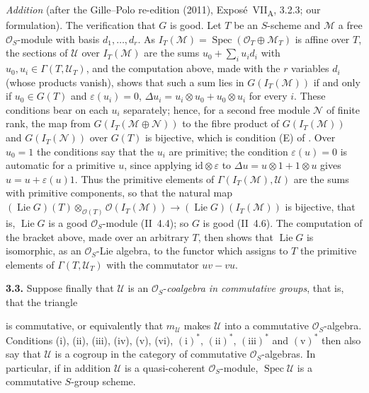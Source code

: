 \par\medskip\noindent
\emph{Addition} (after the Gille--Polo re-edition (2011),
Expos\'e~VII\textsubscript{A}, 3.2.3; our formulation). The verification
that \(G\) is good. Let \(T\) be an \(S\)-scheme and \(\mathcal M\) a free
\(\mathcal O_S\)-module with basis \(d_1,\ldots,d_r\). As
\(I_T(\mathcal M)=\operatorname{Spec}(\mathcal O_T\oplus\mathcal M_T)\) is
affine over \(T\), the sections of \(\mathcal U\) over
\(I_T(\mathcal M)\) are the sums \(u_0+\sum_iu_id_i\) with
\(u_0,u_i\in\Gamma(T,\mathcal U_T)\), and the computation above, made
with the \(r\) variables \(d_i\) (whose products vanish), shows that such
a sum lies in \(G(I_T(\mathcal M))\) if and only if \(u_0\in G(T)\) and
\(\varepsilon(u_i)=0\), \(\Delta u_i=u_i\otimes u_0+u_0\otimes u_i\) for
every \(i\). These conditions bear on each \(u_i\) separately; hence, for
a second free module \(\mathcal N\) of finite rank, the map from
\(G(I_T(\mathcal M\oplus\mathcal N))\) to the fibre product of
\(G(I_T(\mathcal M))\) and \(G(I_T(\mathcal N))\) over \(G(T)\) is
bijective, which is condition (E) of . Over \(u_0=1\) the
conditions say that the \(u_i\) are primitive; the condition
\(\varepsilon(u)=0\) is automatic for a primitive \(u\), since applying
\(\mathrm{id}\otimes\varepsilon\) to \(\Delta u=u\otimes1+1\otimes u\)
gives \(u=u+\varepsilon(u)1\). Thus the primitive elements of
\(\Gamma(I_T(\mathcal M),\mathcal U)\) are the sums with primitive
components, so that the natural map
\((\operatorname{Lie}G)(T)\otimes_{\mathcal O(T)}\mathcal O(I_T(\mathcal M))
\to(\operatorname{Lie}G)(I_T(\mathcal M))\) is bijective, that is,
\(\operatorname{Lie}G\) is a good \(\mathcal O_S\)-module (II~4.4); so \(G\)
is good (II~4.6). The computation of the bracket above, made over an
arbitrary \(T\), then shows that \(\operatorname{Lie}G\) is isomorphic,
as an \(\mathcal O_S\)-Lie algebra, to the functor which assigns to \(T\)
the primitive elements of \(\Gamma(T,\mathcal U_T)\) with the commutator
\(uv-vu\).

\medskip
\noindent\textbf{3.3.}
\label{sga3:VIIA:3.3}
Suppose finally that \(\mathcal U\) is an
\(\mathcal O_S\)-\emph{coalgebra in commutative groups}, that is, that
the triangle
\begin{center}
  \label{sga3:VIIA:3.3-commutative-triangle-i-star}
  
\end{center}
is commutative, or equivalently that \(m_{\mathcal U}\) makes
\(\mathcal U\) into a commutative \(\mathcal O_S\)-algebra.
Conditions (i), (ii), (iii), (iv), (v), (vi),
\((\mathrm{i})^{*}\), \((\mathrm{ii})^{*}\),
\((\mathrm{iii})^{*}\) and \((\mathrm{v})^{*}\) then also say that
\(\mathcal U\) is a cogroup in the category of commutative
\(\mathcal O_S\)-algebras. In particular, if in addition \(\mathcal U\) is
a quasi-coherent \(\mathcal O_S\)-module, \(\operatorname{Spec}\mathcal U\)
is a commutative \(S\)-group scheme.

